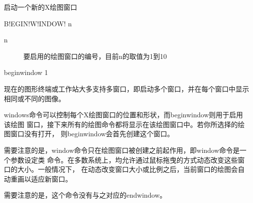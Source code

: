 \label{cmd:beginwindow}

启动一个新的X绘图窗口

\begin{SACSTX}
B!EGIN!W!INDOW! n
\end{SACSTX}

\begin{description}
\item [n] 要启用的绘图窗口的编号，目前n的取值为1到10
\end{description}

\begin{SACDFT}
beginwindow 1
\end{SACDFT}

现在的图形终端或工作站大多支持多窗口，即启动多个窗口，并在每个窗口中显示相同或不同的图像。

windows命令可以控制每个X绘图窗口的位置和形状，而beginwindow则用于启用该绘图
窗口，接下来所有的绘图命令都将显示在该绘图窗口中。若你所选择的绘图窗口没有打开，
则beginwindow会首先创建这个窗口。

需要注意的是，window命令只在绘图窗口被创建之前起作用，即window命令是一个参数设定类
命令。在多数系统上，均允许通过鼠标拖曳的方式动态改变这些窗口的大小。一般情况下，
在动态改变窗口大小或比例之后，当前窗口的绘图会自动重画以适应新窗口。

需要注意的是，这个命令没有与之对应的endwindow。

